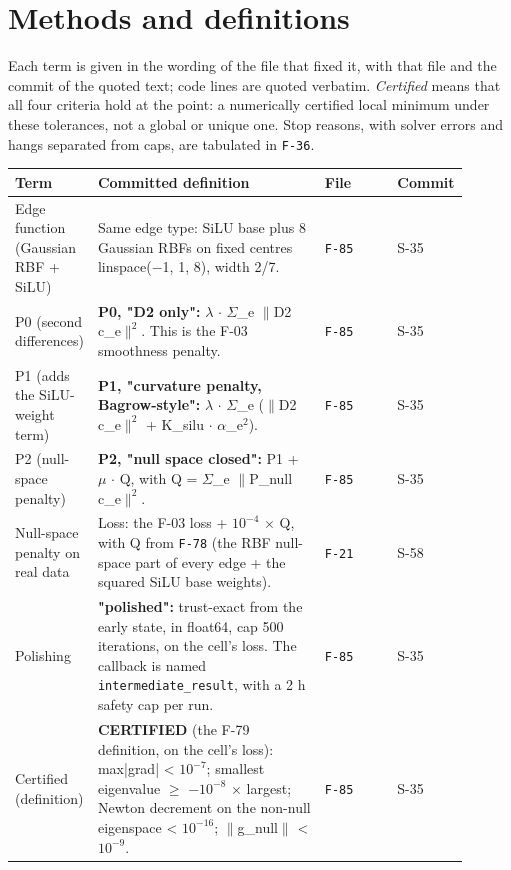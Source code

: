 \section{Methods and definitions}\label{app:methods}
Each term is given in the wording of the file that fixed it, with that file and the commit of the quoted text; code lines are quoted verbatim. \emph{Certified} means that all four criteria hold at the point: a numerically certified local minimum under these tolerances, not a global or unique one. Stop reasons, with solver errors and hangs separated from caps, are tabulated in \texttt{F-36}.
{\footnotesize\setlength{\tabcolsep}{3pt}
\begin{longtable}{R{0.16\linewidth} R{0.50\linewidth} R{0.16\linewidth} R{0.08\linewidth}}
\toprule
Term & Committed definition & File & Commit \\
\midrule
\endhead
Edge function (Gaussian RBF + SiLU) & Same edge type: SiLU base plus 8 Gaussian RBFs on fixed centres linspace($-$1, 1, 8), width 2/7. & \texttt{F-85} & S-35 \\
P0 (second differences) & \textbf{P0, "D2 only":} $\lambda$ $\cdot$ $\Sigma$\_e $\|$D2 c\_e$\|^{2}$. This is the F-03 smoothness penalty. & \texttt{F-85} & S-35 \\
P1 (adds the SiLU-weight term) & \textbf{P1, "curvature penalty, Bagrow-style":} $\lambda$ $\cdot$ $\Sigma$\_e ($\|$D2 c\_e$\|^{2}$ + K\_silu $\cdot$ $\alpha$\_e$^{2}$). & \texttt{F-85} & S-35 \\
P2 (null-space penalty) & \textbf{P2, "null space closed":} P1 + $\mu$ $\cdot$ Q, with Q = $\Sigma$\_e $\|$P\_null c\_e$\|^{2}$. & \texttt{F-85} & S-35 \\
Null-space penalty on real data & Loss: the F-03 loss + $10^{-4}$ $\times$ Q, with Q from \texttt{F-78} (the RBF null-space part of every edge + the squared SiLU base weights). & \texttt{F-21} & S-58 \\
Polishing & \textbf{"polished":} trust-exact from the early state, in float64, cap 500 iterations, on the cell's loss. The callback is named \texttt{intermediate\_result}, with a 2 h safety cap per run. & \texttt{F-85} & S-35 \\
Certified (definition) & \textbf{CERTIFIED} (the F-79 definition, on the cell's loss): max|grad| < $10^{-7}$; smallest eigenvalue $\geq$ $-10^{-8}$ $\times$ largest; Newton decrement on the non-null eigenspace < $10^{-16}$; $\|$g\_null$\|$ < $10^{-9}$. & \texttt{F-85} & S-35 \\

\end{longtable}}

